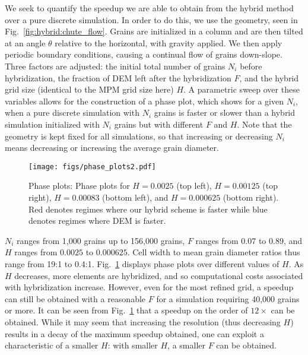 We seek to quantify the speedup we are able to obtain from the hybrid
method over a pure discrete simulation. In order to do this, we use the geometry, seen in
Fig.~\ref{fig:hybrid:chute_flow}. Grains are initialized in a column and are then tilted at an angle $\theta$ relative
to the horizontal, with gravity applied. We then apply periodic boundary conditions, causing a continual 
flow of grains down-slope. Three factors are adjusted: the initial total number of grains $N_i$ before hybridization, the fraction of DEM left
after the hybridization $F$, and the hybrid grid size (identical to the MPM grid size here) $H$. A parametric sweep
over these variables allows for the construction of a phase plot, which shows for a given $N_i$, when a 
pure discrete simulation with $N_i$ grains is faster or slower than a hybrid simulation initialized with $N_i$ grains but with
different $F$ and $H$. Note that the geometry is kept fixed for all simulations, so that increasing or decreasing $N_i$ means
decreasing or increasing the average grain diameter.

\begin{figure}
  \centering
  \texttt{[image: figs/phase\_plots2.pdf]}
  \caption{
    Phase plots: Phase plots for $H = 0.0025$ (top left), $H = 0.00125$ (top right), $H = 0.00083$ (bottom left), and $H = 0.000625$ (bottom right). Red denotes
    regimes where our hybrid scheme is faster while blue denotes regimes where DEM is faster.
  }
  \label{fig:hybrid:phase_plots}
\end{figure}

$N_i$ ranges from 1,000 grains up to 156,000 grains, $F$ ranges from $0.07$ to $0.89$, and $H$ ranges from $0.0025$ to $0.000625$. Cell width to mean grain diameter ratios thus range from 19:1 to 0.4:1.
Fig.~\ref{fig:hybrid:phase_plots} displays phase plots over different values of $H$. As $H$ decreases, more elements are hybridized, and so computational costs associated
with hybridization increase. However, even for the most refined grid, a speedup can still be obtained with a reasonable $F$ for a simulation requiring 40,000 grains or more.
It can be seen from Fig.~\ref{fig:hybrid:phase_plots} that a speedup on the order of $12\times$ can be obtained. While it may seem that increasing the resolution (thus decreasing $H$)
results in a decay of the maximum speedup obtained, one can exploit a characteristic of a smaller $H$: with smaller $H$, a smaller $F$ can be obtained.

